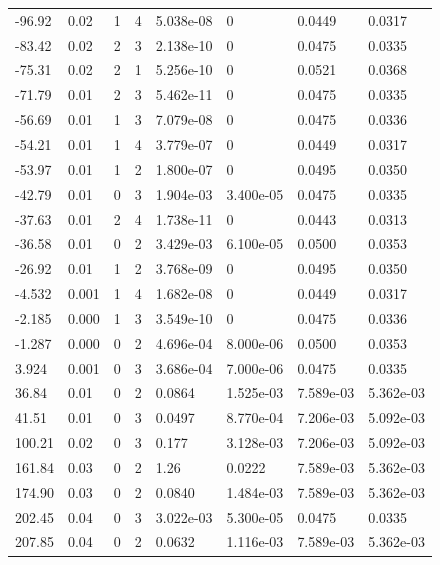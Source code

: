 \documentclass[preview]{standalone}
\begin{document}
{{\begin{tabular}{L{1.2cm}C{1.2cm} C{0.3cm}C{0.5cm} C{1.4cm}C{1.4cm} C{1.4cm}C{1.4cm}}
  -96.92  &  0.02  & 1     &  4 &  5.038e-08  & 0  & 0.0449 &  0.0317   \\ 
  -83.42  &  0.02  & 2     &  3 &  2.138e-10  & 0  & 0.0475 &  0.0335   \\ 
  -75.31  &  0.02  & 2     &  1 &  5.256e-10  & 0  & 0.0521 &  0.0368   \\ 
  -71.79  &  0.01  & 2     &  3 &  5.462e-11  & 0  & 0.0475 &  0.0335   \\ 
  -56.69  &  0.01  & 1     &  3 &  7.079e-08  & 0  & 0.0475 &  0.0336   \\ 
  -54.21  &  0.01  & 1     &  4 &  3.779e-07  & 0  & 0.0449 &  0.0317   \\ 
  -53.97  &  0.01  & 1     &  2 &  1.800e-07  & 0  & 0.0495 &  0.0350   \\ 
  -42.79  &  0.01  & 0     &  3 &  1.904e-03  & 3.400e-05  & 0.0475 &  0.0335   \\ 
  -37.63  &  0.01  & 2     &  4 &  1.738e-11  & 0  & 0.0443 &  0.0313   \\ 
  -36.58  &  0.01  & 0     &  2 &  3.429e-03  & 6.100e-05  & 0.0500 &  0.0353   \\ 
  -26.92  &  0.01  & 1     &  2 &  3.768e-09  & 0  & 0.0495 &  0.0350   \\ 
  -4.532  &  0.001  & 1     &  4 &  1.682e-08  & 0  & 0.0449 &  0.0317   \\ 
  -2.185  &  0.000  & 1     &  3 &  3.549e-10  & 0  & 0.0475 &  0.0336   \\ 
  -1.287  &  0.000  & 0     &  2 &  4.696e-04  & 8.000e-06  & 0.0500 &  0.0353   \\ 
  3.924  &  0.001  & 0     &  3 &  3.686e-04  & 7.000e-06  & 0.0475 &  0.0335   \\ 
  36.84  &  0.01  & 0     &  2 &  0.0864  & 1.525e-03  & 7.589e-03 &  5.362e-03   \\ 
  41.51  &  0.01  & 0     &  3 &  0.0497  & 8.770e-04  & 7.206e-03 &  5.092e-03   \\ 
  100.21  &  0.02  & 0     &  3 &  0.177  & 3.128e-03  & 7.206e-03 &  5.092e-03   \\ 
  161.84  &  0.03  & 0     &  2 &  1.26  & 0.0222  & 7.589e-03 &  5.362e-03   \\ 
  174.90  &  0.03  & 0     &  2 &  0.0840  & 1.484e-03  & 7.589e-03 &  5.362e-03   \\ 
  202.45  &  0.04  & 0     &  3 &  3.022e-03  & 5.300e-05  & 0.0475 &  0.0335   \\ 
  207.85  &  0.04  & 0     &  2 &  0.0632  & 1.116e-03  & 7.589e-03 &  5.362e-03   \\ 

\end{tabular}}}
\end{document}
